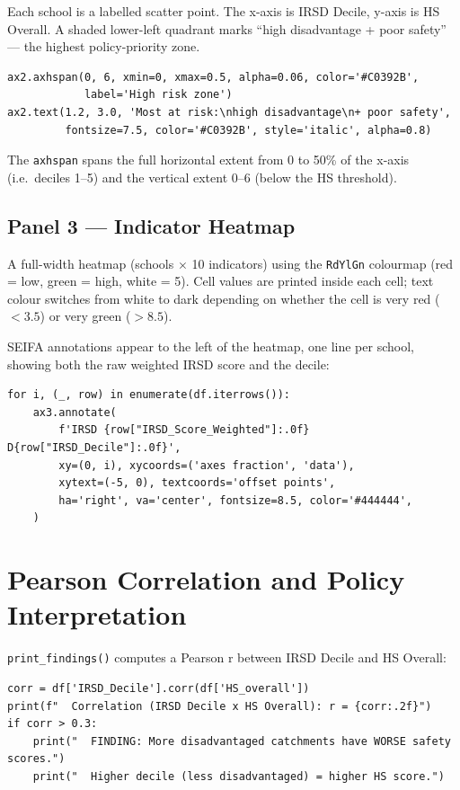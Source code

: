 \documentclass[11pt,a4paper,openany]{book}
\begin{document}
Each school is a labelled scatter point.  The x-axis is IRSD Decile, y-axis is HS Overall.
A shaded lower-left quadrant marks ``high disadvantage + poor safety'' --- the highest
policy-priority zone.

\begin{lstlisting}[style=python, caption={Quadrant shading in Panel 2.}]
ax2.axhspan(0, 6, xmin=0, xmax=0.5, alpha=0.06, color='#C0392B',
            label='High risk zone')
ax2.text(1.2, 3.0, 'Most at risk:\nhigh disadvantage\n+ poor safety',
         fontsize=7.5, color='#C0392B', style='italic', alpha=0.8)
\end{lstlisting}

The \texttt{axhspan} spans the full horizontal extent from 0 to 50\% of the x-axis
(i.e.\ deciles 1--5) and the vertical extent 0--6 (below the HS threshold).

\subsection{Panel 3 --- Indicator Heatmap}

A full-width heatmap (schools $\times$ 10 indicators) using the \texttt{RdYlGn} colourmap
(red = low, green = high, white = 5).  Cell values are printed inside each cell;
text colour switches from white to dark depending on whether the cell is very red
($< 3.5$) or very green ($> 8.5$).

SEIFA annotations appear to the left of the heatmap, one line per school, showing both
the raw weighted IRSD score and the decile:

\begin{lstlisting}[style=python, caption={SEIFA annotation on the left of the heatmap.}]
for i, (_, row) in enumerate(df.iterrows()):
    ax3.annotate(
        f'IRSD {row["IRSD_Score_Weighted"]:.0f}  D{row["IRSD_Decile"]:.0f}',
        xy=(0, i), xycoords=('axes fraction', 'data'),
        xytext=(-5, 0), textcoords='offset points',
        ha='right', va='center', fontsize=8.5, color='#444444',
    )
\end{lstlisting}

\section{Pearson Correlation and Policy Interpretation}

\texttt{print\_findings()} computes a Pearson r between IRSD Decile and HS Overall:

\begin{lstlisting}[style=python, caption={Correlation and interpretation.}]
corr = df['IRSD_Decile'].corr(df['HS_overall'])
print(f"  Correlation (IRSD Decile x HS Overall): r = {corr:.2f}")
if corr > 0.3:
    print("  FINDING: More disadvantaged catchments have WORSE safety scores.")
    print("  Higher decile (less disadvantaged) = higher HS score.")
\end{lstlisting}
\end{document}
